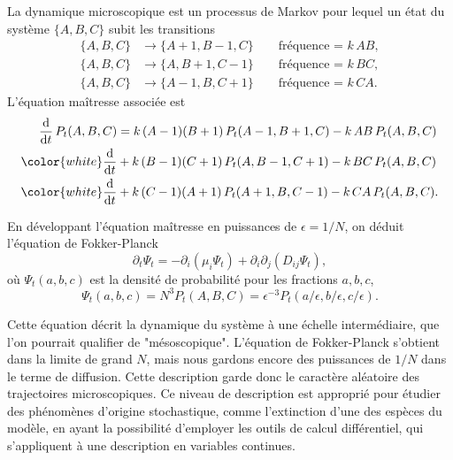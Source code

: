 \documentclass[openany,a4paper,12pt]{article}
\begin{document}
\par La dynamique microscopique est un processus de Markov pour lequel un état du système $\{A,B,C\}$ subit les transitions 
%
\begin{equation}\label{dyn_micro}
\begin{split}
	\{A,B,C\} &\longrightarrow \{A+1,B-1,C\}  \qquad \text{fréquence = } k\, AB, \\
	\{A,B,C\} &\longrightarrow \{A,B+1,C-1\}  \qquad \text{fréquence = } k\, BC, \\
	\{A,B,C\} &\longrightarrow \{A-1,B,C+1\}  \qquad \text{fréquence = } k\, CA.
\end{split}
\end{equation}
%
L'équation maîtresse associée est 
%
\begin{equation}\label{eq_maitresse}
\begin{split}
	\frac{\dd}{\dd t}\, P_t(A,B,C) 
	&= k\, (A-1)(B+1)\, P_t(A-1,B+1,C) - k\, AB\, P_t(A,B,C) \\
	{\color{white}\frac{\dd}{\dd t}} %
	&+ k\, (B-1)(C+1)\, P_t(A,B-1,C+1) - k\, BC\, P_t(A,B,C) \\
	{\color{white}\frac{\dd}{\dd t}} %
	&+ k\, (C-1)(A+1)\, P_t(A+1,B,C-1) - k\, CA\, P_t(A,B,C).
\end{split}
\end{equation}


\par En développant l'équation maîtresse en puissances de $\epsilon = 1/N$, on déduit l'équation de Fokker-Planck 
%
\begin{equation}\label{eq_FP}
	\partial_t \Psi_t = - \partial_i ( \mu_i \Psi_t ) + \partial_i\partial_j (D_{ij} \Psi_t),
\end{equation}
%
où $\Psi_t(a,b,c)$ est la densité de probabilité pour les fractions $a,b,c$,
%
\begin{equation}\label{lien_psi_proba}
	\Psi_t(a,b,c) = N^3 P_t(A,B,C) = \epsilon^{-3} P_t(a/\epsilon, b/\epsilon, c/\epsilon).
\end{equation}

\par Cette équation décrit la dynamique du système à une échelle intermédiaire, que l'on pourrait qualifier de "mésoscopique". L'équation de Fokker-Planck s'obtient dans la limite de grand $N$, mais nous gardons encore des puissances de $1/N$ dans le terme de diffusion. Cette description garde donc le caractère aléatoire des trajectoires microscopiques. Ce niveau de description est approprié pour étudier des phénomènes d'origine stochastique, comme l'extinction d'une des espèces du modèle, en ayant la possibilité d'employer les outils de calcul différentiel, qui s'appliquent à une description en variables continues.
\end{document}

